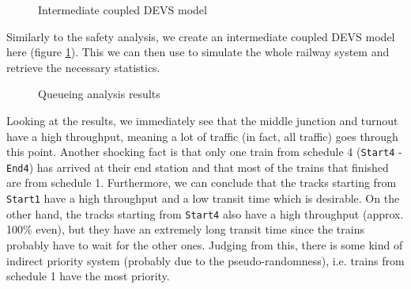 \documentclass{article}
\begin{document}
\begin{figure}[H]
    \begin{center}
    \end{center}
    \caption{Intermediate coupled DEVS model}
    \label{example_devs_devs}
\end{figure}

Similarly to the safety analysis, we create an intermediate coupled DEVS model here (figure \ref{example_devs_devs}). This we can then use to simulate the whole railway system and retrieve the necessary statistics.

\begin{figure}[H]
    \begin{center}
    \end{center}
    \caption{Queueing analysis results}
    \label{example_devs_results}
\end{figure}

Looking at the results, we immediately see that the middle junction and turnout have a high throughput, meaning a lot of traffic (in fact, all traffic) goes through this point. Another shocking fact is that only one train from schedule 4 (\texttt{Start4} - \texttt{End4}) has arrived at their end station and that most of the trains that finished are from schedule 1. Furthermore, we can conclude that the tracks starting from \texttt{Start1} have a high throughput and a low transit time which is desirable. On the other hand, the tracks starting from \texttt{Start4} also have a high throughput (approx. 100\% even), but they have an extremely long transit time since the trains probably have to wait for the other ones. Judging from this, there is some kind of indirect priority system (probably due to the pseudo-randomness), i.e. trains from schedule 1 have the most priority.
\end{document}
